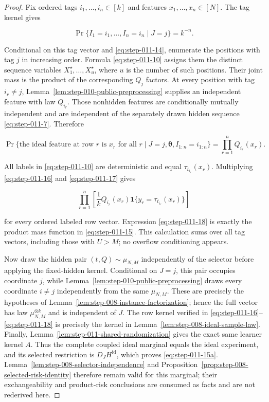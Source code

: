\begin{proof}
Fix ordered tags \(i_1,\ldots,i_n\in[k]\) and features
\(x_1,\ldots,x_n\in[N]\). The tag kernel gives

\[
  \Pr\{I_1=i_1,\ldots,I_n=i_n\mid J=j\}=k^{-n}.
\tag{S11.16}\label{eq:step-011-16}
\]

Conditional on this tag vector and \eqref{eq:step-011-14}, enumerate the positions with
tag \(j\) in increasing order. Formula \eqref{eq:step-011-10} assigns them the distinct
sequence variables \(X_1^\star,\ldots,X_u^\star\), where \(u\) is the
number of such positions. Their joint mass is the product of the
corresponding \(Q_j\) factors. At every position with tag \(i_r\ne j\),
Lemma~\ref{lem:step-010-public-preprocessing} supplies an
independent feature with law \(Q_{i_r}\). Those nonhidden features are
conditionally mutually independent and are independent of the separately
drawn hidden sequence \eqref{eq:step-011-7}. Therefore

\[
  \Pr\{\text{the ideal feature at row }r\text{ is }x_r
        \text{ for all }r
       \mid J=j,\boldsymbol\theta,I_{1:n}=i_{1:n}\}
  =\prod_{r=1}^n Q_{i_r}(x_r).
\tag{S11.17}\label{eq:step-011-17}
\]

All labels in \eqref{eq:step-011-10} are deterministic and equal
\(\tau_{t_{i_r}}(x_r)\). Multiplying \eqref{eq:step-011-16} and \eqref{eq:step-011-17} gives

\[
  \prod_{r=1}^n\left[
    \frac1k Q_{i_r}(x_r)
    \mathbf1\{y_r=\tau_{t_{i_r}}(x_r)\}
  \right]
\tag{S11.18}\label{eq:step-011-18}
\]

for every ordered labeled row vector. Expression \eqref{eq:step-011-18} is exactly the
product mass function in \eqref{eq:step-011-15}. This calculation sums over all tag vectors,
including those with \(U>M\); no overflow conditioning appears.

Now draw the hidden pair \((t,Q)\sim\mu_{N,M}\) independently of the
selector before applying the fixed-hidden kernel. Conditional on \(J=j\),
this pair occupies coordinate \(j\), while
Lemma~\ref{lem:step-010-public-preprocessing} draws every coordinate
\(i\ne j\) independently from the
same \(\mu_{N,M}\). These are precisely the hypotheses of Lemma~\ref{lem:step-008-instance-factorization}; hence the full vector has
law \(\mu_{N,M}^{\otimes k}\) and is independent of \(J\). The row kernel
verified in \eqref{eq:step-011-16}--\eqref{eq:step-011-18} is precisely the kernel in Lemma~\ref{lem:step-008-ideal-sample-law}. Finally,
Lemma~\ref{lem:step-011-shared-randomization} gives the exact same learner
kernel \(A\). Thus the complete coupled ideal marginal equals the ideal experiment, and its selected restriction is \(D_JH^{\mathrm{id}}\),
which proves \eqref{eq:step-011-15a}. Lemma~\ref{lem:step-008-selector-independence} and
Proposition~\ref{prop:step-008-selected-risk-identity} therefore remain
valid for this marginal; their exchangeability and product-risk
conclusions are consumed as facts and are not rederived here.


\end{proof}
